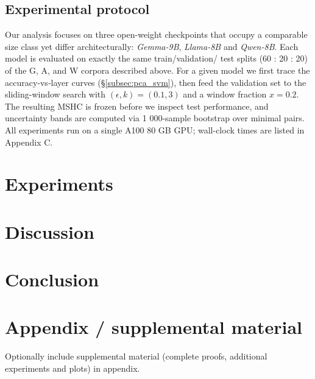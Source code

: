 \documentclass{article}
\begin{document}
\subsection{Experimental protocol}
\label{subsec:protocol}

Our analysis focuses on three open-weight checkpoints that occupy a comparable
size class yet differ architecturally: \emph{Gemma-9B}, \emph{Llama-8B} and
\emph{Qwen-8B}.  Each model is evaluated on exactly the same train/validation/
test splits (60 : 20 : 20) of the G, A, and W corpora described above.  For a
given model we first trace the accuracy‑vs‑layer curves
(§\ref{subsec:pca_svm}), then feed the validation set to the sliding-window
search with $(\epsilon,k)=(0.1,3)$ and a window fraction $x\!=\!0.2$.  The
resulting MSHC is frozen before we inspect test performance, and uncertainty
bands are computed via 1 000-sample bootstrap over minimal pairs.  All
experiments run on a single A100 80 GB GPU; wall-clock times are listed in
Appendix C.
\section{Experiments}

\section{Discussion}

\section{Conclusion}





\appendix
\section{Appendix / supplemental material}

Optionally include supplemental material (complete proofs, additional experiments and plots) in appendix.
\end{document}
